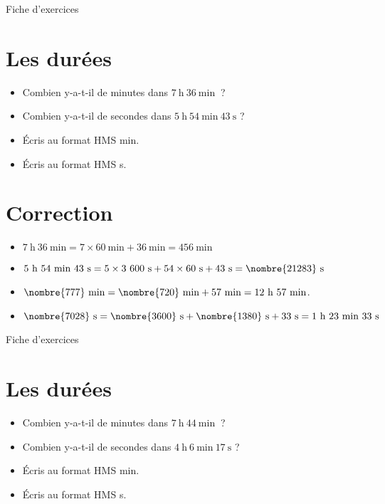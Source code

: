 \documentclass[a4paper,11pt,fleqn]{article}
\begin{document}
\newpage
\setcounter{exo}{0}
\setcounter{section}{0}
\begin{center}
	{\huge Fiche d'exercices } 	
\end{center}


\section{Les durées}
\begin{itemize}
  \item Combien y-a-t-il de minutes dans $7~\text{h}~36~\text{min}~$ ?
  \item Combien y-a-t-il de secondes dans $5~\text{h}~54~\text{min}~43~\text{s}$ ?
  \item Écris au format HMS  min.
  \item Écris au format HMS  s.
\end{itemize}

\section{Correction}
\begin{itemize}
 \item $7~\text{h}~36~\text{min}=7\times60~\text{min}+36~\text{min}=456~\text{min}$
  \item $5~\text{h}~54~\text{min}~43~\text{s}=5\times3~600~\text{s}+54\times60~\text{s}+43~\text{s}=\nombre{21283}~\text{s}$
  \item $\nombre{777}~\text{min}=\nombre{720}~\text{min}+57~\text{min}=12~\text{h}~57~\text{min}$.
  \item $\nombre{7028}~\text{s}=\nombre{3600}~\text{s}+\nombre{1380}~\text{s}+33~\text{s}=1~\text{h}~23~\text{min}~33~\text{s}$ \end{itemize}


\newpage
\setcounter{exo}{0}
\setcounter{section}{0}
\begin{center}
	{\huge Fiche d'exercices } 	
\end{center}


\section{Les durées}
\begin{itemize}
  \item Combien y-a-t-il de minutes dans $7~\text{h}~44~\text{min}~$ ?
  \item Combien y-a-t-il de secondes dans $4~\text{h}~6~\text{min}~17~\text{s}$ ?
  \item Écris au format HMS  min.
  \item Écris au format HMS  s.
\end{itemize}
\end{document}
